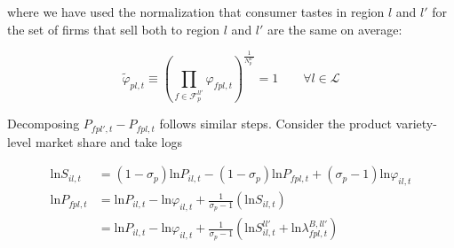 \noindent where we have used the normalization that consumer tastes in region $l$ and $l'$ for the set of firms that sell both to region $l$ and $l'$ are the same on average: 
\begin{linenomath*}    
\begin{equation*}
    \tilde{\varphi}_{pl,t} \equiv 
    \left(
        \prod_{f \in \mathcal{F}^{ll'}_{p}} \varphi_{fpl,t} 
    \right)^{\frac{1}{N^{ll'}_{p}}} = 1 \qquad \forall l \in \mathcal{L}
\end{equation*}
\end{linenomath*}    


\noindent Decomposing $P_{fpl',t} - P_{fpl,t}$ follows similar steps. Consider the product variety-level market share and take logs
\begin{linenomath*}    
\begin{equation*}
    \begin{aligned}
        \text{ln} S_{il,t} 
            &=  \left(1-\sigma_p\right) \text{ln}P_{il,t} - \left(1-\sigma_p\right) \text{ln}P_{fpl,t} + 
                \left(\sigma_p-1\right)\text{ln} \varphi_{il,t} \\
        \text{ln} P_{fpl,t} 
            &=  \text{ln}P_{il,t} - \text{ln} \varphi_{il,t} + 
                \frac{1}{\sigma_p-1}\left(\text{ln} S_{il,t}\right) \\
            &=  \text{ln}P_{il,t} - \text{ln} \varphi_{il,t} + 
                \frac{1}{\sigma_p-1}
                \left(\text{ln} S^{ll'}_{il,t} + \text{ln} \lambda^{B,ll'}_{fpl,t}\right)
    \end{aligned}
\end{equation*}
\end{linenomath*}    

